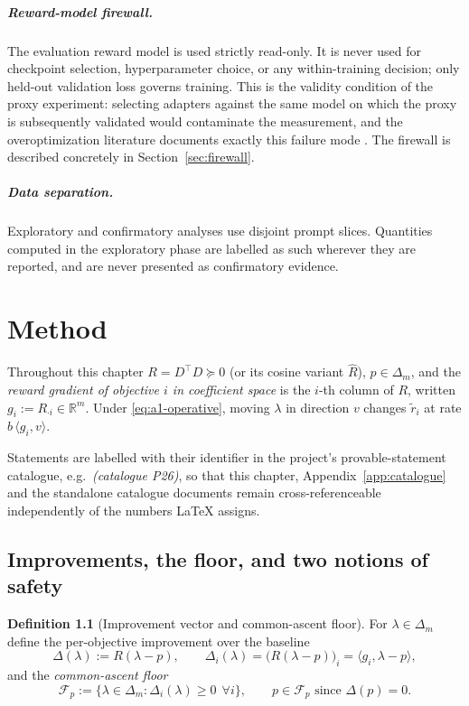 \documentclass[12pt,a4paper]{report}
\newcommand{\R}{\mathbb{R}}
\newcommand{\1}{\mathbf{1}}
\newcommand{\Floor}{\mathcal{F}_{p}}
\theoremstyle{definition}
\newtheorem{definition}{Definition}
\begin{document}
\paragraph{Reward-model firewall.} The evaluation reward model is used strictly read-only. It is never used for checkpoint selection, hyperparameter choice, or any within-training decision; only held-out validation loss governs training. This is the validity condition of the proxy experiment: selecting adapters against the same model on which the proxy is subsequently validated would contaminate the measurement, and the overoptimization literature documents exactly this failure mode \citep{gao2023overoptimization}. The firewall is described concretely in Section~\ref{sec:firewall}.

\paragraph{Data separation.} Exploratory and confirmatory analyses use disjoint prompt slices. Quantities computed in the exploratory phase are labelled as such wherever they are reported, and are never presented as confirmatory evidence.

\chapter{Method}
\label{chap:method}

Throughout this chapter \(R=D^\top D\succeq 0\) (or its cosine variant \(\hat R\)), \(p\in\Delta_m\), and the \emph{reward gradient of objective \(i\) in coefficient space} is the \(i\)-th column of \(R\), written \(g_i:=R_{\cdot i}\in\R^m\). Under \eqref{eq:a1-operative}, moving \(\lambda\) in direction \(v\) changes \(\tilde r_i\) at rate \(b\,\langle g_i,v\rangle\).

Statements are labelled with their identifier in the project's provable-statement catalogue, e.g.\ \emph{(catalogue P26)}, so that this chapter, Appendix~\ref{app:catalogue} and the standalone catalogue documents remain cross-referenceable independently of the numbers \LaTeX{} assigns.

\section{Improvements, the floor, and two notions of safety}
\label{sec:floor}

\begin{definition}[Improvement vector and common-ascent floor]
\label{def:floor}
For \(\lambda\in\Delta_m\) define the per-objective improvement over the baseline
\[
\Delta(\lambda):=R(\lambda-p),
\qquad
\Delta_i(\lambda)=\bigl(R(\lambda-p)\bigr)_i=\langle g_i,\lambda-p\rangle,
\]
and the \emph{common-ascent floor}
\[
\Floor:=\{\lambda\in\Delta_m:\Delta_i(\lambda)\ge 0\ \ \forall i\},
\qquad p\in\Floor \text{ since } \Delta(p)=0 .
\]
\end{definition}
\end{document}
